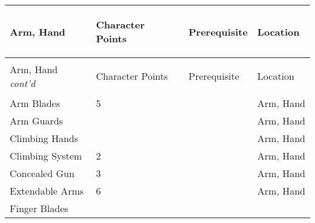 \documentclass[twoside]{book}
\begin{document}
\begin{longtable}{p{1.25in}p{2em}ll} 
  Arm, Hand
  &
  \begin{turn}{70}{Character Points}\end{turn}
          
  &
  \begin{turn}{70}{Prerequisite}\end{turn}
          
  &
  \begin{turn}{70}{Location}\end{turn}
          
  \\
  \hline
  \hline
  \endfirsthead
  Arm, Hand \textit{cont'd}
        
  &
  \begin{turn}{70}{Character Points}\end{turn}
          
  &
  \begin{turn}{70}{Prerequisite}\end{turn}
          
  &
  \begin{turn}{70}{Location}\end{turn}
          
  \\
  \hline
  \endhead
      
  \raggedright
           Arm Blades 
  &
   5 
  &
  
  &
   Arm, Hand 
  \tabularnewline
      
  \raggedright
           Arm Guards 
  &
  
  &
  
  &
   Arm, Hand 
  \tabularnewline
      
  \raggedright
           Climbing Hands 
  &
  
  &
  
  &
   Arm, Hand 
  \tabularnewline
      
  \raggedright
           Climbing System 
  &
   2 
  &
  
  &
   Arm, Hand 
  \tabularnewline
      
  \raggedright
           Concealed Gun 
  &
   3 
  &
  
  &
   Arm, Hand 
  \tabularnewline
      
  \raggedright
           Extendable Arms 
  &
   6 
  &
  
  &
   Arm, Hand 
  \tabularnewline
      
  \raggedright
           Finger Blades 
  &
  

\end{longtable}
\end{document}
